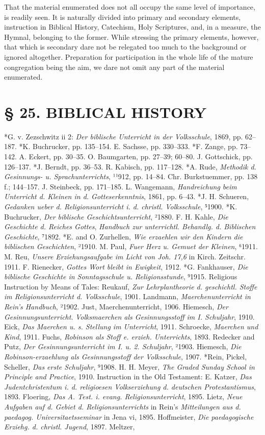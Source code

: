 That the material enumerated does not all occupy the same level of importance, is readily seen. It is naturally divided into primary and secondary elements, instruction in Biblical History, Catechism, Holy Scriptures, and, in a measure, the Hymnal, belonging to the former. While stressing the primary elements, however, that which is secondary dare not be relegated too much to the background or ignored altogether. Preparation for participation in the whole life of the mature congregation being the aim, we dare not omit any part of the material enumerated.
\chapter{§ 25. BIBLICAL HISTORY}

*G. v. Zezschwitz ii 2: \emph{Der biblische Unterricht in der Volksschule}, 1869, pp. 62–187. *K. Buchrucker, pp. 135–154. E. Sachsse, pp. 330–333. *F. Zange, pp. 73–142. A. Eckert, pp. 30–35. O. Baumgarten, pp. 27–39; 60–80. J. Gottschick, pp. 126–137. *J. Berndt, pp. 36–53. R. Kabisch, pp. 117–128. *A. Rude, \emph{Methodik d. Gesinnungs- u. Sprachunterrichts}, ¹¹912, pp. 14–84. Chr. Burkstuemmer, pp. 138 f.; 144–157. J. Steinbeck, pp. 171–185. L. Wangemann, \emph{Handreichung beim Unterricht d. Kleinen in d. Gotteserkenntnis}, 1861, pp. 6–43. *J. H. Schueren, \emph{Gedanken ueber d. Religionsunterricht i. d. christl. Volksschule}, ⁵1900. *K. Buchrucker, \emph{Der biblische Geschichtsunterricht}, ²1880. F. H. Kahle, \emph{Die Geschichte d. Reiches Gottes}, \emph{Handbuch zur unterrichtl. Behandlg. d. Biblischen Geschichte}, ⁷1892. *E. and O. Zurhellen, \emph{Wie erzaehlen wir den Kindern die biblischen Geschichten}, ²1910. M. Paul, \emph{Fuer Herz u. Gemuet der Kleinen}, ⁶1911. M. Reu, \emph{Unsere Erziehungsaufgabe im Licht von Joh. 17,6} in Kirch. Zeitschr. 1911. F. Rienecker, \emph{Gottes Wort bleibt in Ewigkeit}, 1912. *G. Fankhauser, \emph{Die biblische Geschichte in Sonntagsschule u. Religionsstunde}, ⁹1915. Religious Instruction by Means of Tales: Reukauf, \emph{Zur Lehrplantheorie d. geschichtl. Stoffe im Religionsunterricht d. Volksschule}, 1901. Landmann, \emph{Maerchenunterricht in Rein’s Handbuch}, ²1902. Just, Maerchenunterricht, 1906. Hiemesch, \emph{Der Gesinnungsunterricht}. \emph{Volksmaerchen als Gesinnungsstoff im I. Schuljahr}, 1910. Eick, \emph{Das Maerchen u. s. Stellung im Unterricht}, 1911. Schroecke, \emph{Maerchen und Kind}, 1911. Fuchs, \emph{Robinson als Stoff e. erzieh. Unterrichts}, 1893. Redecker and Putz, \emph{Der Gesinnungsunterricht im I. u. 2. Schuljahr}, ²1903. Hiemesch, \emph{Die Robinson-erzaehlung als Gesinnungsstoff der Volksschule}, 1907. *Rein, Pickel, Scheller, \emph{Das erste Schuljahr}, ⁹1908. H. H. Meyer, \emph{The Graded Sunday School in Principle and Practice}, 1910. Instruction in the Old Testament: E. Katzer, \emph{Das Judentchristentum i. d. religioesen Volkserziehung d. deutschen Protestantismus}, 1893. Floering, \emph{Das A. Test. i. evang. Religionsunterricht}, 1895. Lietz, \emph{Neue Aufgaben auf d. Gebiet d. Religionsunterrichts} in Rein’s \emph{Mitteilungen aus d. paedagog. Universitaetsseminar} in Jena vi, 1895. Hoffmeister, \emph{Die paedagogische Erziehg. d. christl. Jugend}, 1897. Meltzer, 